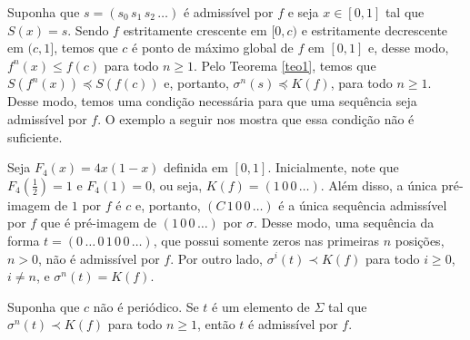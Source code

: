 Suponha que $s = (s_0\, s_1\, s_2\, \dots)$ é admissível por $f$ e seja $x \in [0, 1]$ tal que $S(x) = s$. Sendo $f$ estritamente crescente em $[0, c)$ e estritamente decrescente em $(c, 1]$, temos que $c$ é ponto de máximo global de $f$ em $[0, 1]$ e, desse modo, $f^n(x) \leq f(c)$ para todo $n \geq 1$. Pelo Teorema \ref{teo1}, temos que $S(f^n(x)) \preceq S(f(c))$ e, portanto, $\sigma^n(s) \preceq K(f)$, para todo $n \geq 1$. Desse modo, temos uma condição necessária para que uma sequência seja admissível por $f$. O exemplo a seguir nos mostra que essa condição não é suficiente.

\begin{example}
Seja $F_4(x) = 4x(1-x)$ definida em $[0, 1]$. Inicialmente, note que $F_4\left(\frac{1}{2}\right) = 1$ e $F_4(1) = 0$, ou seja, $K(f) = (1\, 0\, 0\, \dots)$. Além disso, a única pré-imagem de $1$ por $f$ é $c$ e, portanto, $(C\, 1\, 0\, 0\, \dots)$ é a única sequência admissível por $f$ que é pré-imagem de $(1\, 0\, 0\, \dots)$ por $\sigma$. Desse modo, uma sequência da forma $t = (0\, \dots\, 0\, 1\, 0\, 0\, \dots)$, que possui somente zeros nas primeiras $n$ posições, $n > 0$, não é admissível por $f$. Por outro lado, $\sigma^i(t) \prec K(f)$ para todo $i \geq 0$, $i \neq n$, e $\sigma^n(t) = K(f)$. 
\end{example}

\begin{theorem}
Suponha que $c$ não é periódico. Se $t$ é um elemento de $\Sigma$ tal que $\sigma^n(t) \prec K(f)$ para todo $n \geq 1$, então $t$ é admissível por $f$.
\end{theorem}

